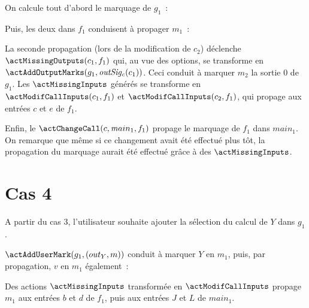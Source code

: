 On calcule tout d'abord le marquage de $g_1$~:

\bb

Puis, les deux \actChangeCall{} dans $f_1$ conduisent à propager $m_1$~:

\bb

La seconde propagation (lors de la modification de $c_2$)
déclenche $\actMissingOutputs(c_1, f_1)$
qui, au vue des options, se transforme en $\actAddOutputMarks(g_1,
\outsigc(c_1))$. Ceci conduit à marquer $m_2$ la sortie 0 de $g_1$.
Les $\actMissingInputs$ générés se transforme en $\actModifCallInputs(c_1, f_1)$
et $\actModifCallInputs(c_2, f_1)$, qui propage \spare{} aux entrées $c$ et $e$ de
$f_1$.

\bb

Enfin, le $\actChangeCall(c, {\mathit main}_1, f_1)$ propage le marquage de
$f_1$ dans ${\mathit main}_1$. On remarque que même si ce changement avait été
effectué plus tôt, la propagation du marquage aurait été effectué grâce à des
$\actMissingInputs$.

\bb


\section{Cas 4}

A partir du cas 3, l'utilisateur souhaite ajouter la sélection du calcul de $Y$
dans $g_1$.\bb

$\actAddUserMark(g_1, (out_Y, m))$ conduit à marquer $Y$ en $m_1$,
puis, par propagation, $v$ en $m_1$ également~:

\bb

Des actions $\actMissingInputs$ transformée en $\actModifCallInputs$ propage
$m_1$ aux entrées $b$ et $d$ de $f_1$, puis aux entrées $J$ et $L$ de ${\mathit
main}_1$.

\bb

